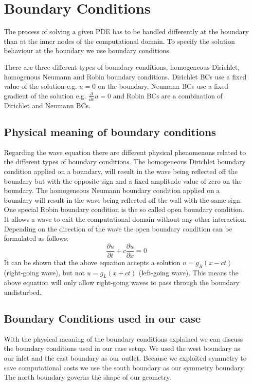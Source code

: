 \documentclass[fleqn,12pt]{NTFD} %
\begin{document}
\section{Boundary Conditions}
The process of solving a given PDE has to be handled differently at the boundary than at the inner nodes of the computational domain. To specify the solution behaviour at the boundary we use boundary conditions.

There are three different types of boundary conditions, homogeneous Dirichlet, homogenous Neumann and Robin boundary conditions. Dirichlet BCs use a fixed value of the solution e.g. $u = 0$ on the boundary, Neumann BCs use a fixed gradient of the solution e.g. $\frac{\partial}{\partial x}u = 0$ and Robin BCs are a combination of Dirichlet and Neumann BCs.

\subsection{Physical meaning of boundary conditions}

Regarding the wave equation there are different physical phenomenons related to the different types of boundary conditions.
The homogeneous Dirichlet boundary condition applied on a boundary, will result in the wave being reflected off the boundary but with the opposite sign and a fixed amplitude value of zero on the boundary.
The homogeneous Neumann boundary condition applied on a boundary will result in the wave being reflected off the wall with the same sign.
One special Robin boundary condition is the so called open boundary condition. It allows a wave to exit the computational domain without any other interaction. Depending on the direction of the wave the open boundary condition can be formulated as follows:
\begin{equation}
    \frac{\partial u}{\partial t}+c\frac{\partial u}{\partial x}=0
\end{equation}
It can be shown that the above equation accepts a solution $u=g_R(x-ct)$ (right-going wave), but not $u=g_L(x+ct)$ (left-going wave). This means the above equation will only allow right-going waves to pass through the boundary undisturbed.

\subsection{Boundary Conditions used in our case}

With the physical meaning of the boundary conditions explained we can discuss the boundary conditions used in our case setup. We used the west boundary as our inlet and the east boundary as our outlet. Because we exploited symmetry to save computational costs we use the south boundary as our symmetry boundary. The north boundary governs the shape of our geometry.
\end{document}
